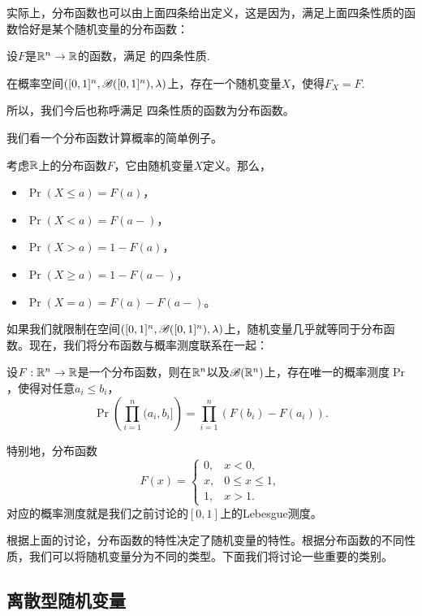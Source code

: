 实际上，分布函数也可以由上面四条给出定义，这是因为，满足上面四条性质的函数恰好是某个随机变量的分布函数：

\begin{theorem}\label{thm:distribution-function}
设$F$是$\mathbb{R}^n\to\mathbb{R}$的函数，满足 的四条性质. 

在概率空间$([0,1]^n,\mathscr{B}([0,1]^n),\lambda)$上，存在一个随机变量$X$，使得$F_X=F$.
\end{theorem}

所以，我们今后也称呼满足 四条性质的函数为分布函数。

我们看一个分布函数计算概率的简单例子。

\begin{example}\label{ex:distribution-prob}
考虑$\mathbb{R}$上的分布函数$F$，它由随机变量$X$定义。那么，
\begin{itemize}
    \item $\Pr(X\leq a)=F(a)$，
    \item $\Pr(X<a)=F(a-)$，
    \item $\Pr(X>a)=1-F(a)$，
    \item $\Pr(X\geq a)=1-F(a-)$，
    \item $\Pr(X=a)=F(a)-F(a-)$。
\end{itemize}
\end{example}

如果我们就限制在空间$([0,1]^n,\mathscr{B}([0,1]^n),\lambda)$上，随机变量几乎就等同于分布函数。现在，我们将分布函数与概率测度联系在一起：

\begin{theorem}\label{thm:uniqueness-of-distribution-function}
设$F:\mathbb{R}^n\to\mathbb{R}$是一个分布函数，则在$\mathbb{R}^n$以及$\mathscr{B}(\mathbb{R}^n)$上，存在唯一的概率测度$\Pr$，使得对任意$a_i\leq b_i$，
\[
    \Pr\left(\prod_{i=1}^n(a_i,b_i]\right) = \prod_{i=1}^n (F(b_i)-F(a_i)).
\]
\end{theorem}

特别地，分布函数
\[F(x)=\begin{cases}
    0,&x<0,\\
    x,&0\leq x\leq 1,\\
    1,&x>1.
\end{cases}\]
对应的概率测度就是我们之前讨论的$[0,1]$上的Lebesgue测度。

根据上面的讨论，分布函数的特性决定了随机变量的特性。根据分布函数的不同性质，我们可以将随机变量分为不同的类型。下面我们将讨论一些重要的类别。

\subsection{离散型随机变量}


